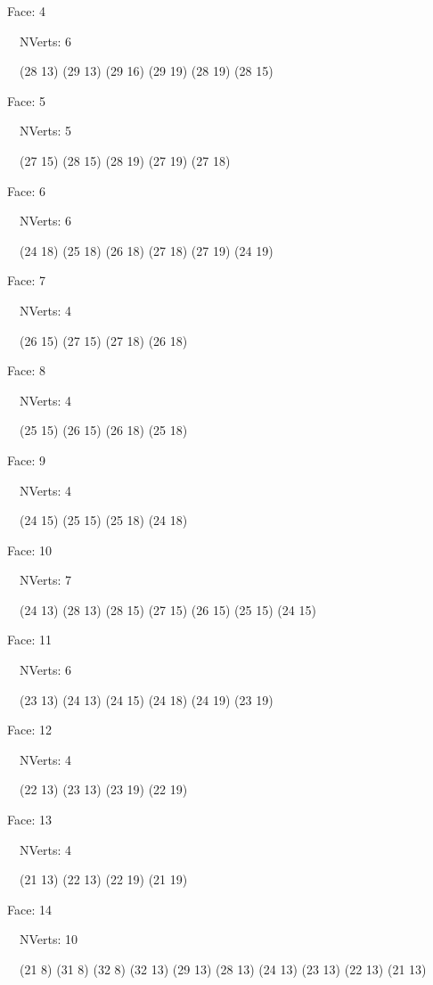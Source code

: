 \documentclass{article}
\begin{document}
{\footnotesize 

Face: 4

\   \    NVerts: 6

 \   \   (28 13) (29 13) (29 16) (29 19) (28 19) (28 15)}

{\footnotesize 

Face: 5

\   \    NVerts: 5

 \   \   (27 15) (28 15) (28 19) (27 19) (27 18)}

{\footnotesize 

Face: 6

\   \    NVerts: 6

 \   \   (24 18) (25 18) (26 18) (27 18) (27 19) (24 19)}

{\footnotesize 

Face: 7

\   \    NVerts: 4

 \   \   (26 15) (27 15) (27 18) (26 18)}

{\footnotesize 

Face: 8

\   \    NVerts: 4

 \   \   (25 15) (26 15) (26 18) (25 18)}

{\footnotesize 

Face: 9

\   \    NVerts: 4

 \   \   (24 15) (25 15) (25 18) (24 18)}

{\footnotesize 

Face: 10

\   \    NVerts: 7

 \   \   (24 13) (28 13) (28 15) (27 15) (26 15) (25 15) (24 15)}

{\footnotesize 

Face: 11

\   \    NVerts: 6

 \   \   (23 13) (24 13) (24 15) (24 18) (24 19) (23 19)}

{\footnotesize 

Face: 12

\   \    NVerts: 4

 \   \   (22 13) (23 13) (23 19) (22 19)}

{\footnotesize 

Face: 13

\   \    NVerts: 4

 \   \   (21 13) (22 13) (22 19) (21 19)}

{\footnotesize 

Face: 14

\   \    NVerts: 10

 \   \   (21 8) (31 8) (32 8) (32 13) (29 13) (28 13) (24 13) (23 13) (22 13) (21 13)}
\end{document}
